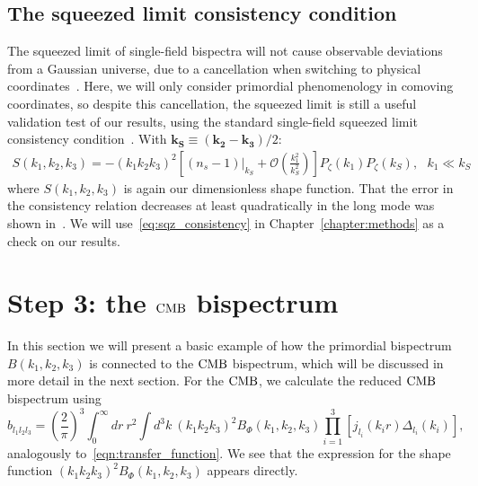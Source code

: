     \subsection{The squeezed limit consistency condition}
The squeezed limit of single-field bispectra will not cause
observable deviations from a Gaussian universe,
due to a cancellation when switching to physical coordinates~\cite{Cabass_2016}.
Here, we will only consider primordial phenomenology
in comoving coordinates, so despite this cancellation,
the squeezed limit is still a useful validation test of our results,
using the standard single-field squeezed limit consistency condition~\cite{sqz_consistency,not_so_sqz}.
With $\mathbf{k_S}\equiv\left(\mathbf{k_2}-\mathbf{k_3}\right)/2 $:
\begin{align}\label{eq:sqz_consistency}
    S(k_1,k_2,k_3) = -(k_1k_2k_3)^2\left[(n_s-1)|_{k_S}+\mathcal{O}\left(\frac{k_1^2}{k_S^2}\right)\right]P_{\zeta}(k_1)P_{\zeta}(k_S),
\ \ \  k_1\ll k_S
\end{align}
where $S(k_1,k_2,k_3)$ is again our dimensionless shape function.
That the error in the consistency relation decreases at least quadratically
in the long mode was shown in~\cite{not_so_sqz}.
We will use~\eqref{eq:sqz_consistency} in Chapter~\ref{chapter:methods}
as a check on our results.


\section{Step 3: the $\text{CMB}$ bispectrum}\label{sec:cmb_bis}
    In this section we will present a basic example of how the primordial bispectrum
    $B(k_1, k_2, k_3)$ is connected to the $\text{CMB}$ bispectrum, which will be discussed in more
    detail in the next section.
    For the $\text{CMB}$, we calculate the reduced $\text{CMB}$ bispectrum using~\cite{FergShell_2}
    \begin{equation}
    \label{eq:reduced_cmb}
    b_{l_1l_2l_3} = \left(\frac{2}{\pi}\right)^3\int_{0}^{\infty}dr~r^2
        \int d^3k~(k_1k_2k_3)^2 B_{\Phi}(k_1,k_2,k_3)\prod_{i=1}^{3}\left[j_{l_i}(k_ir)\Delta_{l_i}(k_i)\right],
    \end{equation}
    analogously to~\eqref{eqn:transfer_function}.
    We see that the expression for the shape function $(k_1k_2k_3)^2 B_{\Phi}(k_1,k_2,k_3)$ appears directly.


